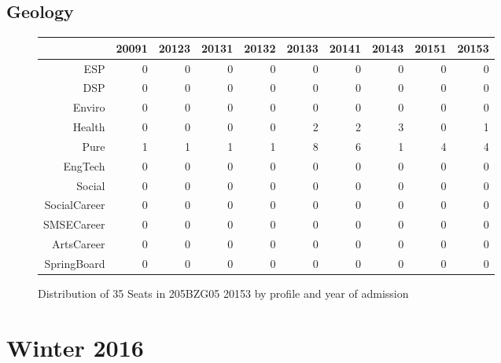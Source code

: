 \documentclass{article}\usepackage[]{graphicx}\usepackage[]{color}
\begin{document}
\subsection{Geology}
\begin{figure}[H]
\centering
\begin{tabular}{rrrrrrrrrr}
  \hline
 & 20091 & 20123 & 20131 & 20132 & 20133 & 20141 & 20143 & 20151 & 20153 \\ 
  \hline
ESP &   0 &   0 &   0 &   0 &   0 &   0 &   0 &   0 &   0 \\ 
  DSP &   0 &   0 &   0 &   0 &   0 &   0 &   0 &   0 &   0 \\ 
  Enviro &   0 &   0 &   0 &   0 &   0 &   0 &   0 &   0 &   0 \\ 
  Health &   0 &   0 &   0 &   0 &   2 &   2 &   3 &   0 &   1 \\ 
  Pure &   1 &   1 &   1 &   1 &   8 &   6 &   1 &   4 &   4 \\ 
  EngTech &   0 &   0 &   0 &   0 &   0 &   0 &   0 &   0 &   0 \\ 
  Social &   0 &   0 &   0 &   0 &   0 &   0 &   0 &   0 &   0 \\ 
  SocialCareer &   0 &   0 &   0 &   0 &   0 &   0 &   0 &   0 &   0 \\ 
  SMSECareer &   0 &   0 &   0 &   0 &   0 &   0 &   0 &   0 &   0 \\ 
  ArtsCareer &   0 &   0 &   0 &   0 &   0 &   0 &   0 &   0 &   0 \\ 
  SpringBoard &   0 &   0 &   0 &   0 &   0 &   0 &   0 &   0 &   0 \\ 
   \hline
\end{tabular}
\caption{Distribution of 35 Seats in 205BZG05 20153 by profile and year of admission} 
\end{figure}



\section{Winter 2016}
\end{document}
